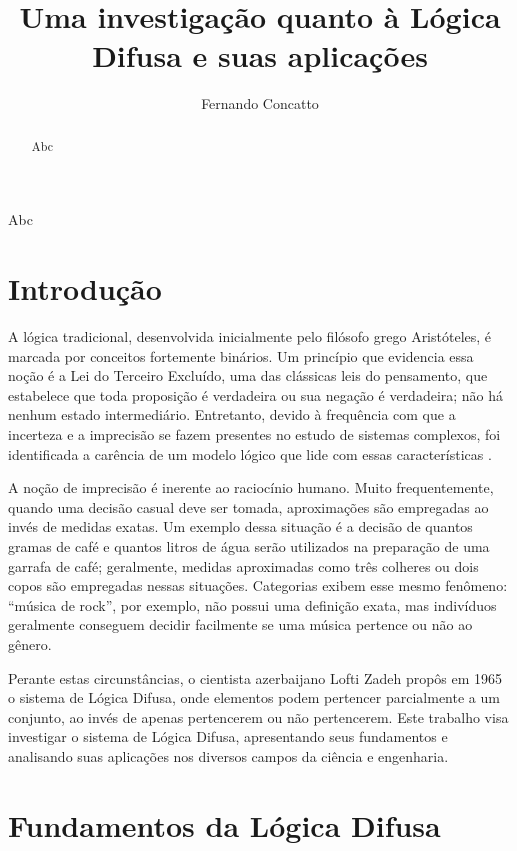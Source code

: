 \documentclass[12pt]{article}
\title{Uma investigação quanto à Lógica Difusa e suas aplicações}
\author{Fernando Concatto\inst{1}}
\begin{document}
\maketitle

\begin{abstract}
  Abc
\end{abstract}

\begin{resumo}
  Abc
\end{resumo}


\section{Introdução} \label{sec:intro}

A lógica tradicional, desenvolvida inicialmente pelo filósofo grego Aristóteles, é marcada por conceitos fortemente binários. Um princípio que evidencia essa noção é a Lei do Terceiro Excluído, uma das clássicas leis do pensamento, que estabelece que toda proposição é verdadeira ou sua negação é verdadeira; não há nenhum estado intermediário. Entretanto, devido à frequência com que a incerteza e a imprecisão se fazem presentes no estudo de sistemas complexos, foi identificada a carência de um modelo lógico que lide com essas características \cite{Ross2010}.

A noção de imprecisão é inerente ao raciocínio humano. Muito frequentemente, quando uma decisão casual deve ser tomada, aproximações são empregadas ao invés de medidas exatas. Um exemplo dessa situação é a decisão de quantos gramas de café e quantos litros de água serão utilizados na preparação de uma garrafa de café; geralmente, medidas aproximadas como três colheres ou dois copos são empregadas nessas situações. Categorias exibem esse mesmo fenômeno: ``música de rock'', por exemplo, não possui uma definição exata, mas indivíduos geralmente conseguem decidir facilmente se uma música pertence ou não ao gênero.

Perante estas circunstâncias, o cientista azerbaijano Lofti Zadeh propôs em 1965 o sistema de Lógica Difusa, onde elementos podem pertencer parcialmente a um conjunto, ao invés de apenas pertencerem ou não pertencerem. Este trabalho visa investigar o sistema de Lógica Difusa, apresentando seus fundamentos e analisando suas aplicações nos diversos campos da ciência e engenharia.

\section{Fundamentos da Lógica Difusa} \label{sec:fundaments}
\end{document}
